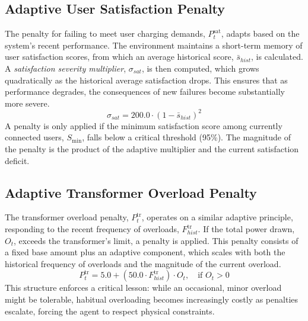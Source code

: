 \subsection{Adaptive User Satisfaction Penalty}
The penalty for failing to meet user charging demands, $P_t^{\text{sat}}$, adapts based on the system's recent performance. The environment maintains a short-term memory of user satisfaction scores, from which an average historical score, $\bar{s}_{hist}$, is calculated. A \textit{satisfaction severity multiplier}, $\sigma_{sat}$, is then computed, which grows quadratically as the historical average satisfaction drops. This ensures that as performance degrades, the consequences of new failures become substantially more severe.
\begin{equation}
    \sigma_{sat} = 200.0 \cdot (1 - \bar{s}_{hist})^2
\end{equation}
\noindent
A penalty is only applied if the minimum satisfaction score among currently connected users, $S_{\min}$, falls below a critical threshold (95\%). The magnitude of the penalty is the product of the adaptive multiplier and the current satisfaction deficit.

\subsection{Adaptive Transformer Overload Penalty}
The transformer overload penalty, $P_t^{\text{tr}}$, operates on a similar adaptive principle, responding to the recent frequency of overloads, $F_{hist}^{\text{tr}}$. If the total power drawn, $O_t$, exceeds the transformer's limit, a penalty is applied. This penalty consists of a fixed base amount plus an adaptive component, which scales with both the historical frequency of overloads and the magnitude of the current overload.
\begin{equation}
    P_t^{\text{tr}} = 5.0 + (50.0 \cdot F_{hist}^{\text{tr}}) \cdot O_t, \quad \text{if } O_t > 0
\end{equation}
\noindent
This structure enforces a critical lesson: while an occasional, minor overload might be tolerable, habitual overloading becomes increasingly costly as penalties escalate, forcing the agent to respect physical constraints.








